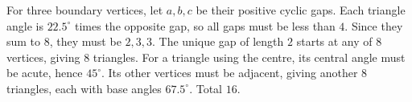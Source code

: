For three boundary vertices, let $a,b,c$ be their positive cyclic gaps. Each triangle angle is $22.5^\circ$ times the opposite gap, so all gaps must be less than $4$. Since they sum to $8$, they must be $2,3,3$. The unique gap of length $2$ starts at any of $8$ vertices, giving $8$ triangles.
For a triangle using the centre, its central angle must be acute, hence $45^\circ$. Its other vertices must be adjacent, giving another $8$ triangles, each with base angles $67.5^\circ$. Total $\boxed{16}$.

